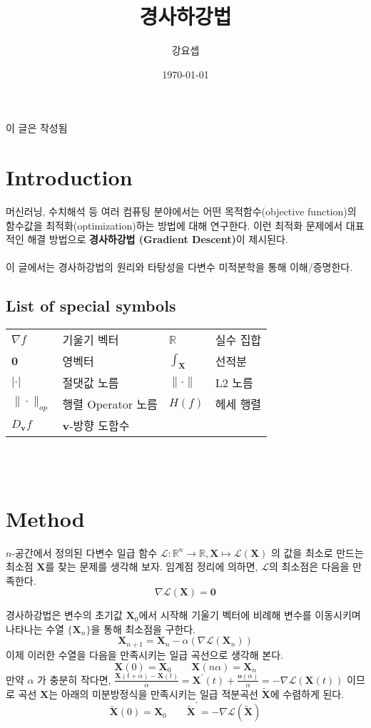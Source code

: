 \documentclass[a4paper,20pt]{article}
\theoremstyle{definition}
\newcommand{\curve}[1][X]{\tilde{\mathbf{#1}}}
\begin{document}
\title{\LARGE{경사하강법}}
\author{강요셉}
\date{\today}
\maketitle
{}
\* 이 글은  작성됨

\newpage

\tableofcontents
\newpage
{}
\section{Introduction}
머신러닝, 수치해석 등 여러 컴퓨팅 분야에서는 어떤 목적함수(objective function)의 함수값을
최적화(optimization)하는 방법에 대해 연구한다. 이런 최적화 문제에서 대표적인 해결 방법으로 \textbf{경사하강법 (Gradient Descent)}이 제시된다. 
\\\\
이 글에서는 경사하강법의 원리와 타탕성을 다변수 미적분학을 통해 이해/증명한다.

	\subsection{List of special symbols}
	\begin{tabular}{llll}
	$\nabla f$ & 기울기 벡터 & $\mathbb{R}$ & 실수 집합 \\ 
	$\mathbf{0}$ & 영벡터 & $\int_{\mathbf{X}}$ & 선적분 \\
	$|\cdot |$ & 절댓값 노름 & $\| \cdot \|$ & L2 노름 \\
	$\| \cdot \|_{op}$ & 행렬 Operator 노름 & $H(f)$ & 헤세 행렬 \\
	$D_{\mathbf{v}}f$ & $\mathbf{v}$-방향 도함수
	\end{tabular}
\\\\
\section{Method}

$n$-공간에서 정의된 다변수 일급 함수 $\mathcal{L}:\mathbb{R}^{n}\rightarrow\mathbb{R}, \mathbf{X}\mapsto\mathcal{L}(\mathbf{X})$
의 값을 최소로 만드는 최소점 $\mathbf{X}$를 찾는 문제를 생각해 보자. 임계점 정리에 의하면, $\mathcal{L}$의 최소점은 다음을 만족한다.
$$\nabla\mathcal{L}(\mathbf{X})=\mathbf{0}$$ 

경사하강법은 변수의 초기값 $\mathbf{X}_{0}$에서 시작해 기울기 벡터에 비례해 변수를 이동시키며 나타나는 수열 $\{ \mathbf{X}_{n}\}$을 통해 최소점을 구한다. 
$$\mathbf{X}_{n+1}=\mathbf{X}_{n}-\alpha(\nabla\mathcal{L}(\mathbf{X}_{n}))$$
이제 이러한 수열을 다음을 만족시키는 일급 곡선으로 생각해 본다.
$$\mathbf{X}(0)=\mathbf{X}_{0} \qquad \mathbf{X}(n\alpha)=\mathbf{X}_{n}$$
만약 $\alpha$ 가 충분히 작다면, $\frac{\mathbf{X}(t+\alpha)-\mathbf{X}(t)}{\alpha} = \mathbf{X}^{\prime}(t)+ \frac{\mathbf{o}(\alpha)}{\alpha}=-\nabla\mathcal{L}(\mathbf{X}(t))$ 이므로
곡선 $\mathbf{X}$는 아래의 미분방정식을 만족시키는 일급 적분곡선 
$\curve$에 수렴하게 된다.
$$ \curve(0)=\mathbf{X}_{0} \qquad \curve^{\prime}=-\nabla\mathcal{L}(\curve) $$
\end{document}
